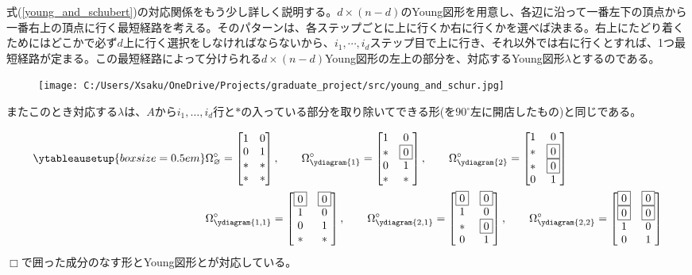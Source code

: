 \documentclass{ltjsreport}
\begin{document}
式(\ref{young_and_schubert})の対応関係をもう少し詳しく説明する。$d\times (n-d)$のYoung図形を用意し、各辺に沿って一番左下の頂点から一番右上の頂点に行く最短経路を考える。そのパターンは、各ステップごとに上に行くか右に行くかを選べば決まる。右上にたどり着くためにはどこかで必ず$d$上に行く選択をしなければならないから、$i_1,\cdots,i_d$ステップ目で上に行き、それ以外では右に行くとすれば、1つ最短経路が定まる。この最短経路によって分けられる$d\times(n-d)$Young図形の左上の部分を、対応するYoung図形$\lambda$とするのである。
\begin{figure}[H]
  \centering
  \texttt{[image: C:/Users/Xsaku/OneDrive/Projects/graduate\_project/src/young\_and\_schur.jpg]}
\end{figure}
またこのとき対応する$\lambda$は、$A$から$i_1,\dots,i_d$行と$*$の入っている部分を取り除いてできる形(を$90^\circ$左に開店したもの)と同じである。



\begin{eg}
\begin{align*}
  \ytableausetup{boxsize=0.5em}
  &\Omega^\circ_{\varnothing}=\bmat{
    1 & 0\\
    0 & 1\\
    * & *\\
    * & *
  },\qquad 
  \Omega^\circ_{\ydiagram{1}}=\bmat{
    1 & 0\\
    * & \fbox{0}\\
    0 & 1\\
    * & *
  },\qquad
  \Omega^\circ_{\ydiagram{2}}=\bmat{
    1 & 0\\
    * & \fbox{0}\\
    * & \fbox{0}\\
    0 & 1
  }\\
  &\Omega^\circ_{\ydiagram{1,1}}=\bmat{
    \fbox{0} & \fbox{0}\\
    1 & 0\\
    0 & 1\\
    * & *
  },\qquad
  \Omega^\circ_{\ydiagram{2,1}}=\bmat{
    \fbox{0} & \fbox{0}\\
    1 & 0\\
    * & \fbox{0}\\
    0 & 1
  },\qquad
  \Omega^\circ_{\ydiagram{2,2}}=\bmat{
    \fbox{0} & \fbox{0}\\
    \fbox{0} & \fbox{0}\\
    1 & 0\\
    0 & 1
  }
\end{align*}
$\Box$で囲った成分のなす形とYoung図形とが対応している。
\end{eg}
\end{document}
